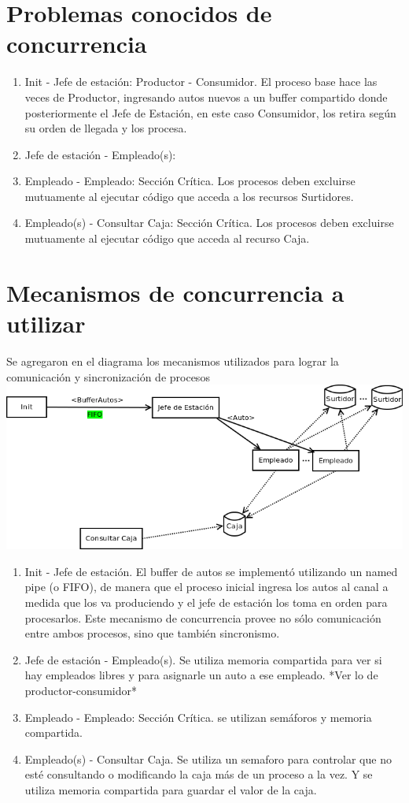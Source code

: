 \documentclass{article}
\begin{document}
\section{Problemas conocidos de concurrencia}
\begin{enumerate}
	\item Init - Jefe de estación: Productor - Consumidor. El proceso base hace las veces de Productor, ingresando autos nuevos a un buffer compartido donde posteriormente el Jefe de Estación, en este caso Consumidor, los retira según su orden de llegada y los procesa.
	\item Jefe de estación - Empleado(s):
	\item Empleado - Empleado: Sección Crítica. Los procesos deben excluirse mutuamente al ejecutar código que acceda a los recursos Surtidores.
	\item Empleado(s) - Consultar Caja: Sección Crítica. Los procesos deben excluirse mutuamente al ejecutar código que acceda al recurso Caja.
\end{enumerate}
\section{Mecanismos de concurrencia a utilizar}
Se agregaron en el diagrama los mecanismos utilizados para lograr la comunicación y sincronización de procesos
\\[1\baselineskip]
\includegraphics[width=\textwidth]{overview+mecanismos}
\begin{enumerate}
        \item Init - Jefe de estación. El buffer de autos se implementó utilizando un named pipe (o FIFO), de manera que el proceso inicial ingresa los autos al canal a medida que los va produciendo y el jefe de estación los toma en orden para procesarlos. Este mecanismo de concurrencia provee no sólo comunicación entre ambos procesos, sino que también sincronismo.
	\item Jefe de estación - Empleado(s). Se utiliza memoria compartida para ver si hay empleados libres y para asignarle un auto a ese empleado.
	*Ver lo de productor-consumidor*
	\item Empleado - Empleado: Sección Crítica. se utilizan semáforos y memoria compartida.
	\item Empleado(s) - Consultar Caja. Se utiliza un semaforo para controlar que no esté consultando o modificando la caja más de un proceso a la vez. Y se utiliza memoria compartida para guardar el valor de la caja.

\end{enumerate}
					
\end{document}
